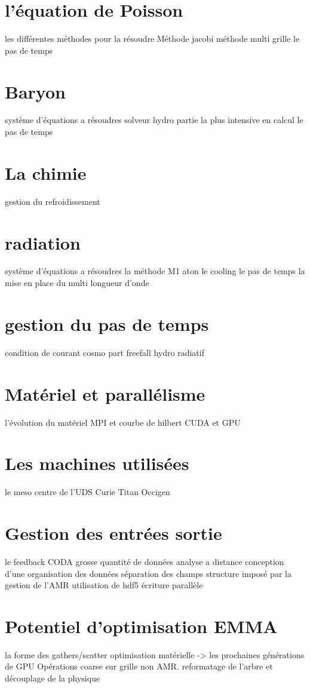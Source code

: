 \section{l'équation de Poisson}
les différentes méthodes pour la résoudre
Méthode jacobi
méthode multi grille
le pas de temps

\section{Baryon}

système d'équations a résoudres
solveur hydro
partie la plus intensive en calcul
le pas de temps

\section{La chimie}

gestion du refroidissement

\section{radiation}

système d'équations a résoudres
la méthode M1
aton
le cooling
le pas de temps
la mise en place du multi longueur d'onde

\section{gestion du pas de temps}

condition de courant
cosmo
part
freefall
hydro
radiatif

\section{Matériel et parallélisme}

l'évolution du matériel
MPI et courbe de hilbert
CUDA et GPU

\section{Les machines utilisées}

le meso centre de l'UDS
Curie
Titan
Occigen

\section{Gestion des entrées sortie}

le feedback CODA
grosse quantité de données
analyse a distance
conception d'une organisation des données
séparation des champs
structure imposé par la gestion de l'AMR
utilisation de hdf5
écriture parallèle

\section{Potentiel d'optimisation EMMA}

la forme des gathers/scatter
optimisation matérielle -> les prochaines générations de GPU
Opérations coarse sur grille non AMR.
reformatage de l'arbre et découplage de la physique
